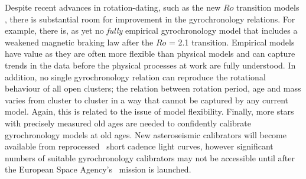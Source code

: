 Despite recent advances in rotation-dating, such as the new $Ro$ transition
models \citep{vansaders2016}, there is substantial room for
improvement in the gyrochronology relations.
For example, there is, as yet no {\it fully} empirical gyrochronology model
that includes a weakened magnetic braking law after the $Ro$ = 2.1 transition.
Empirical models have value as they are often more flexible than physical
models and can capture trends in the data before the physical processes at
work are fully understood.
In addition, no single gyrochronology relation can reproduce the rotational
behaviour of all open clusters; the relation between rotation period, age and
mass varies from cluster to cluster in a way that cannot be captured by
any current model.
Again, this is related to the issue of model flexibility.
Finally, more stars with precisely measured old ages are needed to confidently
calibrate gyrochronology models at old ages.
New asteroseismic calibrators will become available from reprocessed \kepler\
short cadence light curves, however significant numbers of suitable
gyrochronology calibrators may not be accessible until after the European
Space Agency's \plato\ mission is launched.

